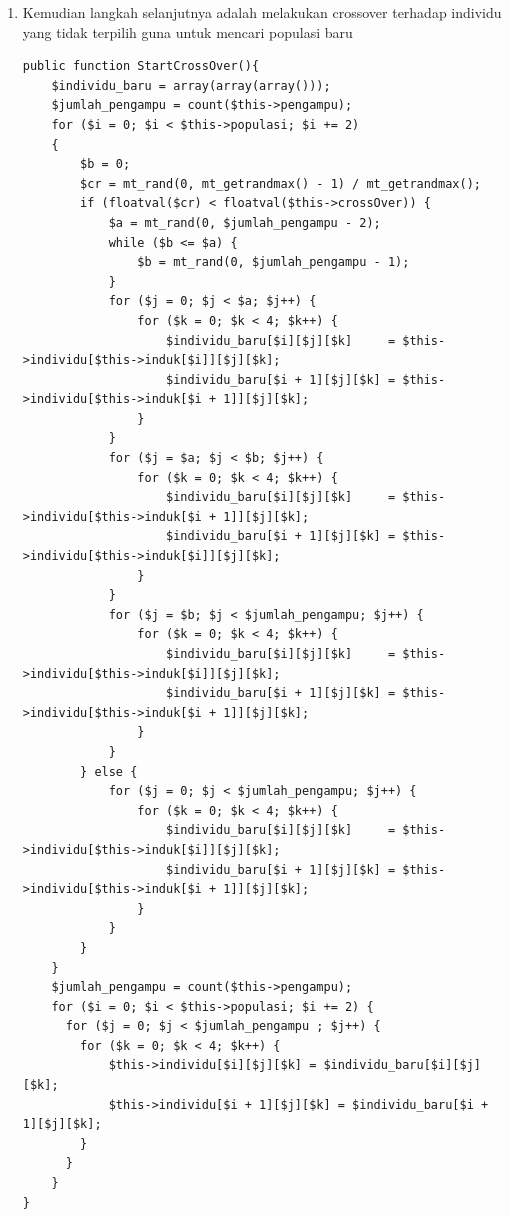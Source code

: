 \begin{enumerate}
	\item Kemudian langkah selanjutnya adalah melakukan crossover terhadap individu yang tidak terpilih guna untuk mencari populasi baru
\begin{lstlisting}
public function StartCrossOver(){
    $individu_baru = array(array(array()));
    $jumlah_pengampu = count($this->pengampu);
    for ($i = 0; $i < $this->populasi; $i += 2)
    {
        $b = 0;
        $cr = mt_rand(0, mt_getrandmax() - 1) / mt_getrandmax();
        if (floatval($cr) < floatval($this->crossOver)) {
            $a = mt_rand(0, $jumlah_pengampu - 2);
            while ($b <= $a) {
                $b = mt_rand(0, $jumlah_pengampu - 1);
            }
            for ($j = 0; $j < $a; $j++) {
                for ($k = 0; $k < 4; $k++) {                        
                    $individu_baru[$i][$j][$k]     = $this->individu[$this->induk[$i]][$j][$k];
                    $individu_baru[$i + 1][$j][$k] = $this->individu[$this->induk[$i + 1]][$j][$k];
                }
            }
            for ($j = $a; $j < $b; $j++) {
                for ($k = 0; $k < 4; $k++) {
                    $individu_baru[$i][$j][$k]     = $this->individu[$this->induk[$i + 1]][$j][$k];
                    $individu_baru[$i + 1][$j][$k] = $this->individu[$this->induk[$i]][$j][$k];
                }
            }
            for ($j = $b; $j < $jumlah_pengampu; $j++) {
                for ($k = 0; $k < 4; $k++) {
                    $individu_baru[$i][$j][$k]     = $this->individu[$this->induk[$i]][$j][$k];
                    $individu_baru[$i + 1][$j][$k] = $this->individu[$this->induk[$i + 1]][$j][$k];
                }
            }
        } else {
            for ($j = 0; $j < $jumlah_pengampu; $j++) {
                for ($k = 0; $k < 4; $k++) {
                    $individu_baru[$i][$j][$k]     = $this->individu[$this->induk[$i]][$j][$k];
                    $individu_baru[$i + 1][$j][$k] = $this->individu[$this->induk[$i + 1]][$j][$k];
                }
            }
        }
    }
    $jumlah_pengampu = count($this->pengampu);
    for ($i = 0; $i < $this->populasi; $i += 2) {
      for ($j = 0; $j < $jumlah_pengampu ; $j++) {
        for ($k = 0; $k < 4; $k++) {
            $this->individu[$i][$j][$k] = $individu_baru[$i][$j][$k];
            $this->individu[$i + 1][$j][$k] = $individu_baru[$i + 1][$j][$k];
        }
      }
    }
}
\end{lstlisting}
		

\end{enumerate}
